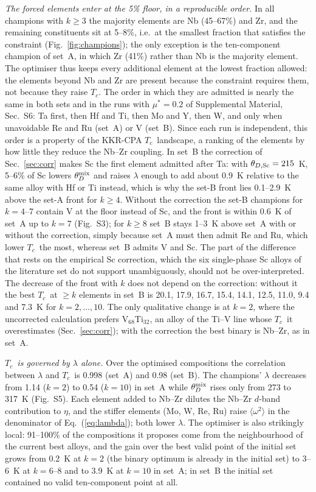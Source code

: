 \documentclass[aps,prb,reprint,superscriptaddress,twocolumn,floatfix]{revtex4-2}
\newcommand{\Tc}{$T_c$}
\newcommand{\SI}[1]{Supplemental Material, Sec.~#1}
\begin{document}
\emph{The forced elements enter at the 5\% floor, in a reproducible order.} In all champions
with $k \geq 3$ the majority elements are Nb (45--67\%) and Zr, and the remaining
constituents sit at 5--8\%, i.e.\ at the smallest fraction that satisfies the constraint
(Fig.~\ref{fig:champions}); the only exception is the ten-component champion of set~A,
in which Zr (41\%) rather than Nb is the majority element. The optimiser thus keeps every
additional element at the lowest fraction allowed: the elements beyond Nb and Zr are
present because the constraint requires them, not because they raise \Tc. The order in which they
are admitted is nearly the same in both sets and in the runs with $\mu^* = 0.2$ of \SI{S6}: Ta
first, then Hf and Ti, then Mo and Y, then W, and only when unavoidable Re and Ru (set~A)
or V (set~B). Since each run is independent, this order is a
property of the KKR-CPA \Tc\ landscape, a ranking of the elements by how little they reduce
the Nb--Zr coupling. In set~B the correction of Sec.~\ref{sec:corr} makes Sc the first element
admitted after Ta: with $\theta_{D,{\rm Sc}} = 215$~K, 5--6\% of Sc lowers
$\theta_D^{\rm mix}$ and raises $\lambda$ enough to add about 0.9~K relative to the same
alloy with Hf or Ti instead, which is why the set-B front lies 0.1--2.9~K above the set-A
front for $k \geq 4$. Without the correction the set-B champions for $k = 4$--7 contain V
at the floor instead of Sc, and the front is within 0.6~K of set~A up to $k = 7$
(Fig.~S3); for $k \geq 8$ set~B stays 1--3~K above set~A with or without the correction,
simply because set~A must then admit Re and Ru, which lower \Tc\ the most, whereas
set~B admits V and Sc. The part of the difference that rests on the empirical Sc correction,
which the six single-phase Sc alloys of the literature set do not support unambiguously,
should not be over-interpreted. The decrease of the front with $k$ does not depend on the
correction: without it the best \Tc\ at $\geq k$ elements in set~B is 20.1, 17.9, 16.7,
15.4, 14.1, 12.5, 11.0, 9.4 and 7.3~K for $k = 2, \dots, 10$. The only qualitative change is
at $k = 2$, where the uncorrected calculation prefers V$_{68}$Ti$_{32}$, an alloy of the
Ti--V line whose \Tc\ it overestimates (Sec.~\ref{sec:corr}); with the correction the best
binary is Nb--Zr, as in set~A.

\emph{\Tc\ is governed by $\lambda$ alone.} Over the optimised compositions the correlation
between $\lambda$ and \Tc\ is 0.998 (set~A) and 0.98 (set~B). The champions' $\lambda$ decreases
from 1.14 ($k = 2$) to 0.54 ($k = 10$) in set~A while $\theta_D^{\rm mix}$ rises only from
273 to 317~K (Fig.~S5). Each element added to Nb--Zr dilutes the Nb--Zr $d$-band
contribution to $\eta$, and the stiffer elements (Mo, W, Re, Ru) raise
$\langle\omega^2\rangle$ in the denominator of Eq.~(\ref{eq:lambda}); both lower $\lambda$.
The optimiser is also strikingly local: 91--100\% of the compositions it proposes come from
the neighbourhood of the current best alloys, and the gain over the best valid point of the
initial set grows from 0.2~K at $k = 2$ (the binary optimum is already in the initial set)
to 3--6~K at $k = 6$--8 and to 3.9~K at $k = 10$ in set~A; in set~B the initial set
contained no valid ten-component point at all.
\end{document}
